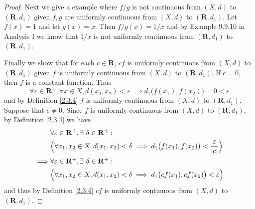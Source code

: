 \begin{proof}
    Next we give a example where \(f / g\) is not continuous from \((X, d)\) to \((\mathbf{R}, d_1)\) given \(f, g\) are uniformly continuous from \((X, d)\) to \((\mathbf{R}, d_1)\).
    Let \(f(x) = 1\) and let \(g(x) = x\).
    Then \(f / g(x) = 1 / x\) and by Example 9.9.10 in Analysis I we know that \(1 / x\) is not uniformly continuous from \((\mathbf{R}, d_1)\) to \((\mathbf{R}, d_1)\).

    Finally we show that for each \(c \in \mathbf{R}\), \(cf\) is uniformly continuous from \((X, d)\) to \((\mathbf{R}, d_1)\) given \(f\) is uniformly continuous from \((X, d)\) to \((\mathbf{R}, d_1)\).
    If \(c = 0\), then \(f\) is a constant function.
    Thus
    \[
        \forall \varepsilon \in \mathbf{R}^+, \forall x \in X, d(x_1, x_2) < \varepsilon \implies d_1\big(f(x_1), f(x_2)\big) = 0 < \varepsilon
    \]
    and by Definition \ref{2.3.4} \(f\) is uniformly continuous from \((X, d)\) to \((\mathbf{R}, d_1)\).
    Suppose that \(c \neq 0\).
    Since \(f\) is uniformly continuous from \((X, d)\) to \((\mathbf{R}, d_1)\), by Definition \ref{2.3.4} we have
    \begin{align*}
                 & \forall \varepsilon \in \mathbf{R}^+, \exists\ \delta \in \mathbf{R}^+:                                                    \\
                 & \Big(\forall x_1, x_2 \in X, d(x_1, x_2) < \delta \implies d_1\big(f(x_1), f(x_2)\big) < \frac{\varepsilon}{\abs*{c}}\Big) \\
        \implies & \forall \varepsilon \in \mathbf{R}^+, \exists\ \delta \in \mathbf{R}^+:                                                    \\
                 & \Big(\forall x_1, x_2 \in X, d(x_1, x_2) < \delta \implies d_1\big(cf(x_1), cf(x_2)\big) < \varepsilon\Big)
    \end{align*}
    and thus by Definition \ref{2.3.4} \(cf\) is uniformly continuous from \((X, d)\) to \((\mathbf{R}, d_1)\).
\end{proof}